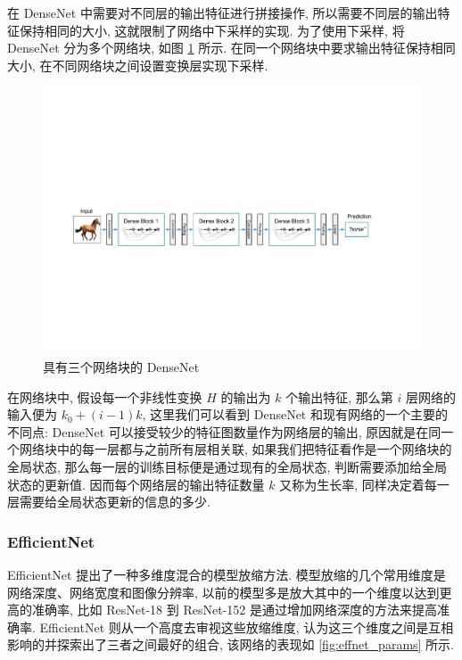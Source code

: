 \documentclass[12pt]{article}
\begin{document}
在 DenseNet 中需要对不同层的输出特征进行拼接操作, 所以需要不同层的输出特征保持相同的大小, 这就限制了网络中下采样的实现. 为了使用下采样, 将 DenseNet 分为多个网络块, 如图 \ref{fig:dense_net} 所示. 在同一个网络块中要求输出特征保持相同大小, 在不同网络块之间设置变换层实现下采样.

\begin{figure}[htbp]
  \centering
  \includegraphics[width=17cm]{denseNet.pdf}
  \caption{具有三个网络块的 DenseNet}
  \label{fig:dense_net}
\end{figure}

在网络块中, 假设每一个非线性变换 $H$ 的输出为 $k$ 个输出特征, 那么第 $i$ 层网络的输入便为 $k_0+(i-1)k$, 这里我们可以看到 DenseNet 和现有网络的一个主要的不同点: DenseNet 可以接受较少的特征图数量作为网络层的输出, 原因就是在同一个网络块中的每一层都与之前所有层相关联, 如果我们把特征看作是一个网络块的全局状态, 那么每一层的训练目标便是通过现有的全局状态, 判断需要添加给全局状态的更新值. 因而每个网络层的输出特征数量 $k$ 又称为生长率, 同样决定着每一层需要给全局状态更新的信息的多少.

\subsubsection{EfficientNet}


EfficientNet \cite{Tan2019Efficientnet} 提出了一种多维度混合的模型放缩方法. 模型放缩的几个常用维度是网络深度、网络宽度和图像分辨率, 以前的模型多是放大其中的一个维度以达到更高的准确率, 比如 ResNet-18 到 ResNet-152 是通过增加网络深度的方法来提高准确率. EfficientNet 则从一个高度去审视这些放缩维度, 认为这三个维度之间是互相影响的并探索出了三者之间最好的组合, 该网络的表现如 \ref{fig:effnet_params} 所示.
\end{document}
